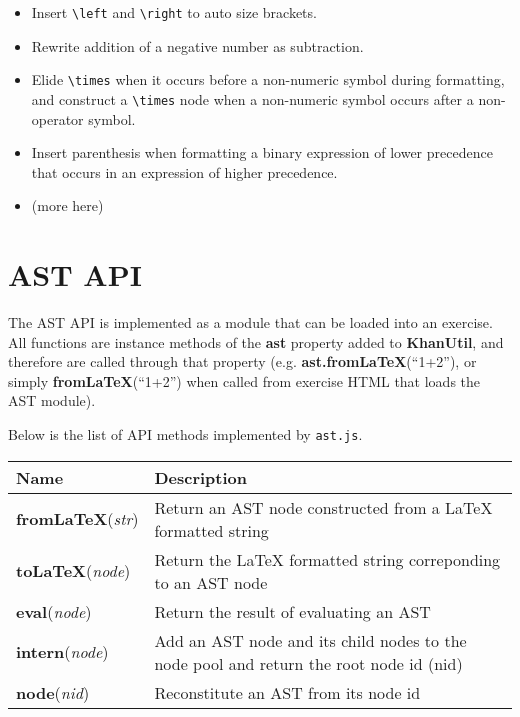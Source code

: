 \documentclass{article}
\begin{document}
\begin{itemize}
\item Insert \verb'\left' and \verb'\right' to auto size brackets.
\item Rewrite addition of a negative number as subtraction.
\item Elide \verb'\times' when it occurs before a non-numeric symbol during formatting, and construct 
      a \verb'\times' node when a non-numeric symbol occurs after a non-operator symbol.
\item Insert parenthesis when formatting a binary expression of lower precedence that occurs in an 
      expression of higher precedence.
\item (more here)
\end{itemize}

\pagebreak
\section{AST API}


The AST API is implemented as a module that can be loaded into an exercise. All functions are 
instance methods of the {\bf ast} property added to {\bf KhanUtil}, and therefore are called through 
that property (e.g. {\bf ast.fromLaTeX}(``1+2''), or simply {\bf fromLaTeX}(``1+2'') when called from
exercise HTML that loads the AST module).

Below is the list of API methods implemented by {\tt ast.js}.

\begin{tabular}{ | l | p{10cm} |}
\hline
{\bf Name} & {\bf Description} \\ \hline
{\bf fromLaTeX}(\emph{str}) & Return an AST node constructed from a LaTeX formatted string \\ \hline
{\bf toLaTeX}(\emph{node})  & Return the LaTeX formatted string correponding to an AST node \\ \hline
{\bf eval}(\emph{node})     & Return the result of evaluating an AST \\ \hline
{\bf intern}(\emph{node})   & Add an AST node and its child nodes to the node pool and return the root node id (nid) \\ \hline
{\bf node}(\emph{nid})      & Reconstitute an AST from its node id \\ \hline
\end{tabular}
\end{document}
